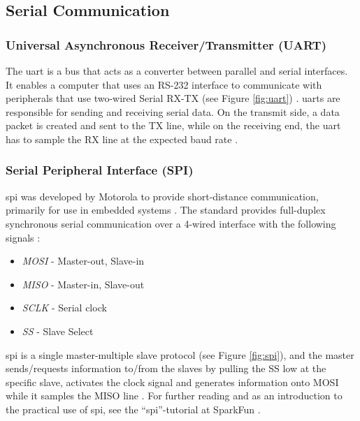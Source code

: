 \subsection{Serial Communication}
\subsubsection{Universal Asynchronous Receiver/Transmitter (UART)}
The \acrfull{uart} is a bus that acts as a converter between parallel and serial interfaces. It enables a computer that uses an RS-232 interface to communicate with peripherals that use two-wired Serial RX-TX (see Figure \ref{fig:uart}) \cite{whatisuart}.
\acrshort{uart}s are responsible for sending and receiving serial data. On the transmit side, a data packet is created and sent to the TX line, while on the receiving end, the \acrshort{uart} has to sample the RX line at the expected baud rate \cite{sparkfunuart}.

\subsubsection{Serial Peripheral Interface (SPI)}
\acrfull{spi} was developed by Motorola to provide short-distance communication, primarily for use in embedded systems \cite{corelis2016}. The standard provides full-duplex synchronous serial communication over a 4-wired interface with the following signals \cite{epanorama2011}:
\begin{itemize}
    \item \textit{MOSI} - Master-out, Slave-in
    \item \textit{MISO} - Master-in, Slave-out
    \item \textit{SCLK} - Serial clock
    \item \textit{SS} - Slave Select
\end{itemize}
\acrshort{spi} is a single master-multiple slave protocol (see Figure \ref{fig:spi}), and the master sends/requests information to/from the slaves by pulling the SS low at the specific slave, activates the clock signal and generates information onto MOSI while it samples the MISO line \cite{byteparadigm}. For further reading and as an introduction to the practical use of \acrshort{spi}, see the ``\acrfull{spi}''-tutorial at SparkFun \cite{sparkfunspi}.
